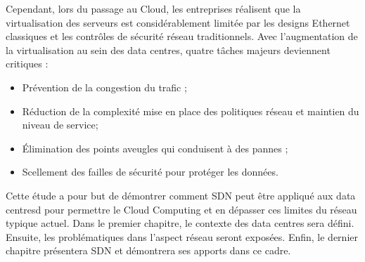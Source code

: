 \par
Cependant, lors du passage au Cloud, les entreprises réalisent que la virtualisation des serveurs est considérablement limitée par les designs Ethernet classiques et les contrôles de sécurité réseau traditionnels. Avec l'augmentation de la virtualisation au sein des data centres, quatre tâches majeurs deviennent critiques :
\begin{itemize}
\item Prévention de la congestion du trafic ;
\item Réduction de la complexité mise en place des politiques réseau et maintien du niveau de service;
\item Élimination des points aveugles qui conduisent à des pannes ;
\item  Scellement des failles de sécurité pour protéger les données. \cite{virtualizedCCCC}\\
\end{itemize}

\par
Cette étude a pour but de démontrer comment SDN peut être appliqué aux data centresd pour permettre le Cloud Computing et en dépasser ces limites du réseau typique actuel. Dans le premier chapitre, le contexte des data centres sera défini. Ensuite, les problématiques dans l'aspect réseau seront exposées. Enfin, le dernier chapitre présentera SDN et démontrera ses apports dans ce cadre.

